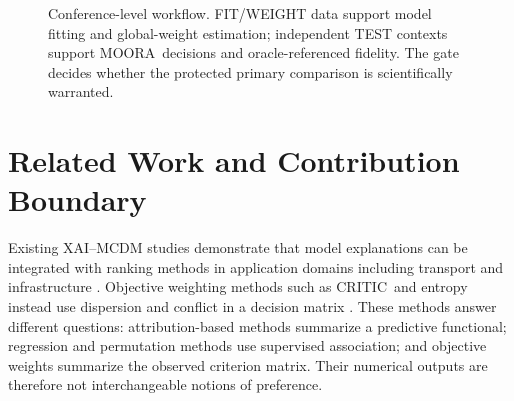 \documentclass[runningheads]{llncs}
\newcommand{\MOORA}{MOORA}
\newcommand{\CRITIC}{CRITIC}
\begin{document}
\begin{figure}[t]
\centering
{}
\caption{Conference-level workflow. FIT/WEIGHT data support model fitting and global-weight
estimation; independent TEST contexts support \MOORA\ decisions and oracle-referenced fidelity.
The gate decides whether the protected primary comparison is scientifically warranted.}
\label{fig:workflow}
\end{figure}

\section{Related Work and Contribution Boundary}
\label{sec:related}

Existing XAI--MCDM studies demonstrate that model explanations can be integrated with ranking
methods in application domains including transport and infrastructure
\cite{ciano2025xaimcdm,demir2025shapmultimoora,zakeri2024mlmcdm}. Objective weighting methods
such as \CRITIC\ and entropy instead use dispersion and conflict in a decision matrix
\cite{diakoulaki1995critic,shannon1948,mukhametzyanov2021objective}. These methods answer
different questions: attribution-based methods summarize a predictive functional; regression
and permutation methods use supervised association; and objective weights summarize the
observed criterion matrix. Their numerical outputs are therefore not interchangeable notions of
preference.
\end{document}
